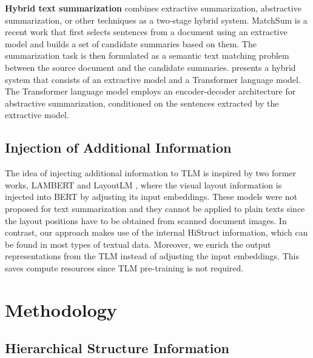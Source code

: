 \documentclass[11pt]{article}
\begin{document}
\textbf{Hybrid text summarization} combines extractive summarization, abstractive summarization, or other techniques as a two-stage hybrid system.
 MatchSum \cite{zhong-etal-2020-extractive} is a recent work that first selects sentences from a document using an extractive model and builds a set of candidate summaries based on them. The summarization task is then formulated as a semantic text matching problem between the source document and the candidate summaries.  \citet{pilault-etal-2020-extractive} presents a hybrid system that consists of an extractive model and a Transformer language model. The Transformer language model employs an encoder-decoder architecture for abstractive summarization, conditioned on the sentences extracted by the extractive model.

 
\subsection{Injection of Additional Information}
\label{subsec:Hierarchical learning}



The idea of injecting additional information to TLM is inspired by two former works, LAMBERT \cite{lambert} and LayoutLM \cite{layoutlm}, where the visual layout information is injected into BERT by adjusting its input embeddings. 
These models were not proposed for text summarization and they cannot be applied to plain texts since the layout positions have to be obtained from scanned document images. In contrast, our approach makes use of the internal HiStruct information, which can be found in most types of textual data. Moreover, we enrich the output representations from the TLM instead of adjusting the input embeddings. This saves compute resources since TLM pre-training is not required.

\section{Methodology}
\label{sec:Methodology}

\subsection{Hierarchical Structure Information}
\label{subsec:hierarchical_structure_features}
\end{document}
